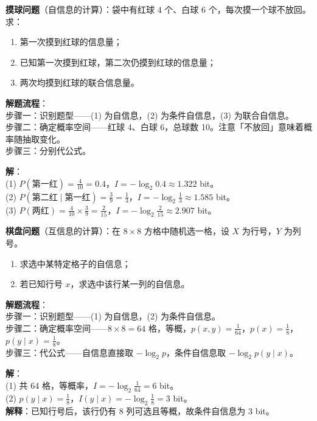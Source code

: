 \begin{example}
\label{ex:ch2-ball-self-information}
\textbf{摸球问题}（自信息的计算）：袋中有红球 $4$ 个、白球 $6$ 个，每次摸一个球不放回。求：
\begin{enumerate}
  \item 第一次摸到红球的信息量；
  \item 已知第一次摸到红球，第二次仍摸到红球的信息量；
  \item 两次均摸到红球的联合信息量。
\end{enumerate}

\noindent \textbf{解题流程}：\\[2pt]
步骤一：识别题型——(1) 为自信息，(2) 为条件自信息，(3) 为联合自信息。\\
步骤二：确定概率空间——红球 4、白球 6，总球数 10。注意「不放回」意味着概率随抽取变化。\\
步骤三：分别代公式。

\textbf{解}：\\
(1) $P(\text{第一红})=\frac{4}{10}=0.4$，$I=-\log_2 0.4 \approx 1.322$ bit。\\
(2) $P(\text{第二红} \mid \text{第一红})=\frac{3}{9}=\frac{1}{3}$，$I=-\log_2\frac{1}{3}\approx 1.585$ bit。\\
(3) $P(\text{两红})=\frac{4}{10}\times\frac{3}{9}=\frac{2}{15}$，$I=-\log_2\frac{2}{15}\approx 2.907$ bit。
\end{example}

\begin{example}
\label{ex:ch2-chessboard-information}
\textbf{棋盘问题}（互信息的计算）：在 $8 \times 8$ 方格中随机选一格，设 $X$ 为行号，$Y$ 为列号。
\begin{enumerate}
  \item 求选中某特定格子的自信息；
  \item 若已知行号 $x$，求选中该行某一列的自信息。
\end{enumerate}

\noindent \textbf{解题流程}：\\[2pt]
步骤一：识别题型——(1) 为自信息，(2) 为条件自信息。\\
步骤二：确定概率空间——$8\times8=64$ 格，等概，$p(x,y)=\frac{1}{64}$，$p(x)=\frac{1}{8}$，$p(y\mid x)=\frac{1}{8}$。\\
步骤三：代公式——自信息直接取 $-\log_2 p$，条件自信息取 $-\log_2 p(y\mid x)$。

\textbf{解}：\\
(1) 共 64 格，等概率，$I=-\log_2\frac{1}{64}=6$ bit。\\
(2) $p(y \mid x)=\frac{1}{8}$，$I(y\mid x)=-\log_2\frac{1}{8}=3$ bit。\\
\textbf{解释}：已知行号后，该行仍有 8 列可选且等概，故条件自信息为 3 bit。
\end{example}

